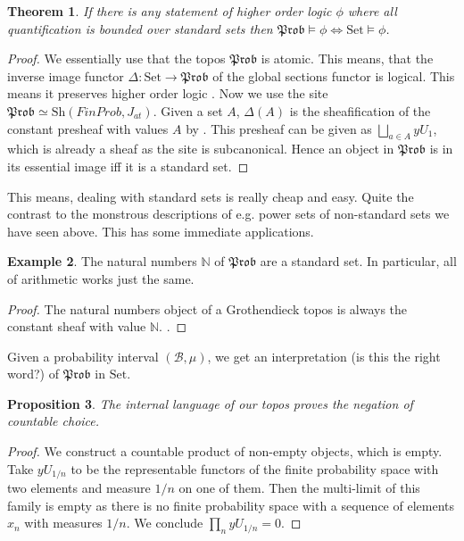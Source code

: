 \documentclass[a4paper]{amsproc}
\theoremstyle{plain}
\newtheorem{theorem}{Theorem}[section]
\newtheorem{proposition}[theorem]{Proposition}
\theoremstyle{definition}
\newtheorem{example}[theorem]{Example}
\theoremstyle{remark}
\numberwithin{equation}{section}
\begin{document}
\begin{theorem} If there is any statement of higher order logic $\phi$ where all quantification is bounded over \emph{standard} sets then $\mathfrak{Prob}\vDash \phi \iff \text{Set}\vDash \phi$.
\end{theorem}
\begin{proof}
We essentially use that the topos $\mathfrak{Prob}$ is atomic. This means, that the inverse image functor $\Delta: \text{Set}\rightarrow \mathfrak{Prob}$ of the global sections functor is logical. This means it preserves higher order logic \cite{XYZ}. Now we use the site $\mathfrak{Prob}\simeq \text{Sh}(FinProb,J_{at})$. Given a set $A$, $\Delta(A)$ is the sheafification of the constant presheaf with values $A$ by \cite{XYZ}. This presheaf can be given as $\bigsqcup_{a\in A}yU_1$, which is already a sheaf as the site is subcanonical.
Hence an object in $\mathfrak{Prob}$ is in its essential image iff it is a standard set. 
\end{proof}
This means, dealing with standard sets is really cheap and easy. Quite the contrast to the monstrous descriptions of e.g. power sets of non-standard sets we have seen above. This has some immediate applications.
\begin{example} The natural numbers $\mathbb{N}$ of $\mathfrak{Prob}$ are a standard set. In particular, all of arithmetic works just the same. %
\end{example}
\begin{proof}
The natural numbers object of a Grothendieck topos is always the constant sheaf with value $\mathbb{N}$. \cite{XYZ}.
\end{proof}
Given a probability interval $(\mathcal{B},\mu)$, we get an interpretation (is this the right word?) of $\mathfrak{Prob}$ in $\text{Set}$. %
\begin{proposition}\label{choice_failture} The internal language of our topos proves the negation of countable choice.
\end{proposition}
\begin{proof} We construct a countable product of non-empty objects, which is empty. Take $yU_{1/n}$ to be the representable functors of the finite probability space with two elements and measure $1/n$ on one of them. Then the multi-limit of this family is empty as there is no finite probability space with a sequence of elements $x_n$ with measures $1/n$. We conclude $\prod_n yU_{1/n}=0$.
\end{proof}
\end{document}
